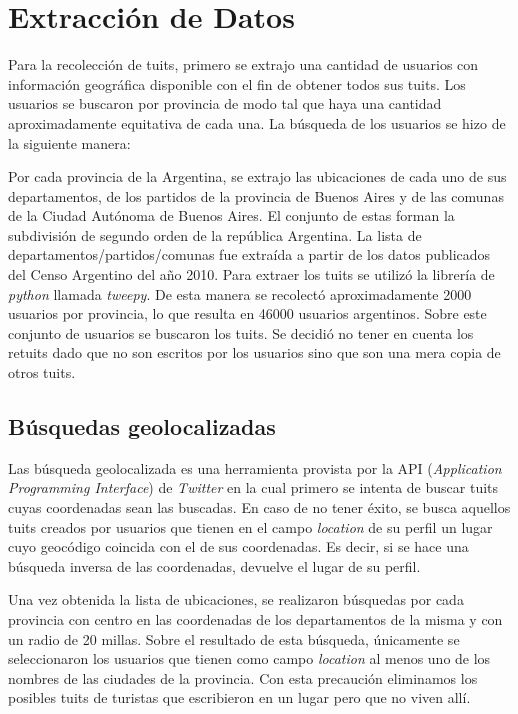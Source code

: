 

\section{Extracción de Datos}

Para la recolección de tuits, primero se extrajo una cantidad de usuarios con información geográfica disponible con el fin de obtener todos sus tuits.
Los usuarios se buscaron por provincia de modo tal que haya una cantidad aproximadamente equitativa de cada una.
La búsqueda de los usuarios se hizo de la siguiente manera:

Por cada provincia de la Argentina, se extrajo las ubicaciones de cada uno de sus departamentos, de los partidos de la provincia de Buenos Aires y de las comunas de la Ciudad Autónoma de Buenos Aires. El conjunto de estas forman la subdivisión de segundo orden de la república Argentina. La lista de departamentos/partidos/comunas fue extraída a partir de los datos publicados del Censo Argentino del año 2010. Para extraer los tuits se utilizó la librería de \textit{python} llamada \textit{tweepy}.
De esta manera se recolectó aproximadamente 2000 usuarios por provincia, lo que resulta en 46000 usuarios argentinos. Sobre este conjunto de usuarios se buscaron los tuits. Se decidió no tener en cuenta los retuits dado que no son escritos por los usuarios sino que son una mera copia de otros tuits. 


\subsection{Búsquedas geolocalizadas}

Las búsqueda geolocalizada es una herramienta provista por la API (\textit{Application Programming Interface}) de \textit{Twitter} en la cual primero se intenta de buscar tuits cuyas coordenadas sean las buscadas. En caso de no tener éxito, se busca aquellos tuits creados por usuarios que tienen en el campo \textit{location} de su perfil un lugar cuyo geocódigo coincida con el de sus coordenadas. Es decir, si se hace una búsqueda inversa de las coordenadas, devuelve el lugar de su perfil.

Una vez obtenida la lista de ubicaciones, se realizaron búsquedas por cada provincia con centro en las coordenadas de los departamentos de la misma y con un radio de 20 millas. Sobre el resultado de esta búsqueda, únicamente se seleccionaron los usuarios que tienen como campo \textit{location} al menos uno de los nombres de las ciudades de la provincia. Con esta precaución eliminamos los posibles tuits de turistas que escribieron en un lugar pero que no viven allí.

